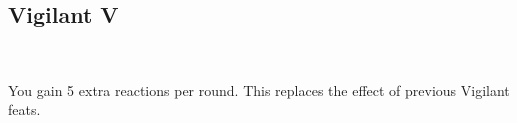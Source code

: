 \subsection*{Vigilant V}\label{feat:vigilant5}
 \\

You gain 5 extra reactions per round. This replaces the effect
of previous Vigilant feats.
